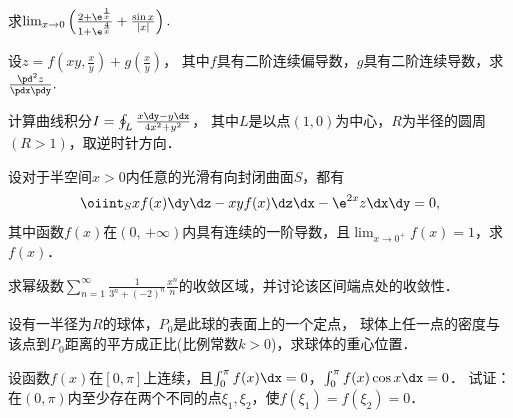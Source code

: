 \documentclass[plain,noanswer,medmath]{../../template/jnuexam}
\begin{document}

\begin{problem}
求$\lim_{x \to 0} \left(\frac{2 + \e^{\frac{1}{x}}}{1 + \e^{\frac{4}{x}}} + \frac{\sin x}{|x|} \right).$
\end{problem}



\begin{problem}
设$z = f\left(xy,\frac{x}{y} \right) + g\left(\frac{x}{y} \right)$，
其中$f$具有二阶连续偏导数，$g$具有二阶连续导数，求$\frac{\pd^2 z}{\pdx\pdy}.$
\end{problem}



\begin{problem}
计算曲线积分$I = \oint_L \frac{x\dy - y\dx}{4x^2 + y^2} $，
其中$L$是以点$\left(1,0 \right)$为中心，$R$为半径的圆周$(R > 1)$，取逆时针方向．
\end{problem}



\begin{problem}
设对于半空间$x > 0$内任意的光滑有向封闭曲面$S$，都有
$$\oiint_S xf(x) \dy\dz - xyf(x)\dz\dx - \e^{2x} z\dx\dy = 0,$$
其中函数$f(x)$在$(\text{0, +}\infty)$内具有连续的一阶导数，且$\lim_{x \to 0^+} f(x) = 1$，求$f(x)$．
\end{problem}



\begin{problem}
求幂级数$\sum_{n = 1}^{\infty}\frac{1}{3^n + (- 2)^n} \frac{x^n}{n}$的收敛区域，并讨论该区间端点处的收敛性．
\end{problem}



\begin{problem}
设有一半径为$R$的球体，$P_0$是此球的表面上的一个定点，
球体上任一点的密度与该点到$P_0$距离的平方成正比(比例常数$k > 0$)，求球体的重心位置．
\end{problem}



\begin{problem}
设函数$f(x)$在$\left[0,\pi \right]$上连续，且$\int_0^{\pi}f(x)\dx = 0$，$\int_0^{\pi}f(x)\cos x\dx = 0$．
试证：在$(0,\pi)$内至少存在两个不同的点$\xi_1,\xi_2$，使$f(\xi_1) = f(\xi_2) = 0$．
\end{problem}


\end{document}
